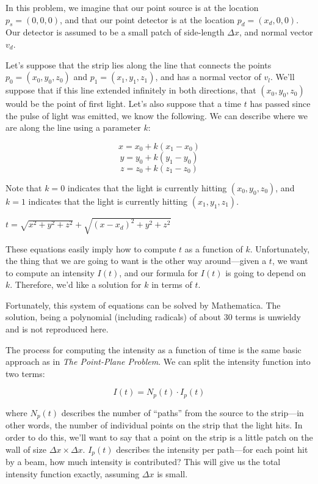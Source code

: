 \documentclass[11pt]{article}
\begin{document}
In this problem, we imagine that our point source is at the location $p_s = (0, 0, 0)$, and that our point detector is at the location $p_d = (x_d, 0, 0)$. Our detector is assumed to be a small patch of side-length $\Delta x$, and normal vector $v_d$. 

Let's suppose that the strip lies along the line that connects the points $p_0 = (x_0, y_0, z_0)$ and $p_1 = (x_1, y_1, z_1)$, and has a normal vector of $v_l$. We'll suppose that if this line extended infinitely in both directions, that $(x_0, y_0, z_0)$ would be the point of first light. Let's also suppose that a time $t$ has passed since the pulse of light was emitted, we know the following. We can describe where we are along the line using a parameter $k$:

$$x = x_0 + k(x_1 - x_0)$$
$$y = y_0 + k(y_1 - y_0)$$
$$z = z_0 + k(z_1 - z_0)$$

Note that $k = 0$ indicates that the light is currently hitting $(x_0, y_0, z_0)$, and $k = 1$ indicates that the light is currently hitting $(x_1, y_1, z_1)$.

$t = \sqrt{x^2+y^2+z^2} + \sqrt{(x-x_d)^2 + y^2 + z^2}$

These equations easily imply how to compute $t$ as a function of $k$. Unfortunately, the thing that we are going to want is the other way around---given a $t$, we want to compute an intensity $I(t)$, and our formula for $I(t)$ is going to depend on $k$. Therefore, we'd like a solution for $k$ in terms of $t$.

Fortunately, this system of equations can be solved by Mathematica. The solution, being a polynomial (including radicals) of about 30 terms is unwieldy and is not reproduced here.

The process for computing the intensity as a function of time is the same basic approach as in \emph{The Point-Plane Problem}. We can split the intensity function into two terms:

$$I(t) = N_p(t) \cdot I_p(t)$$

where $N_p(t)$ describes the number of ``paths'' from the source to the strip---in other words, the number of individual points on the strip that the light hits. In order to do this, we'll want to say that a point on the strip is a little patch on the wall of size $\Delta x \times \Delta x$. $I_p(t)$ describes the intensity per path---for each point hit by a beam, how much intensity is contributed? This will give us the total intensity function exactly, assuming $\Delta x$ is small.
\end{document}
